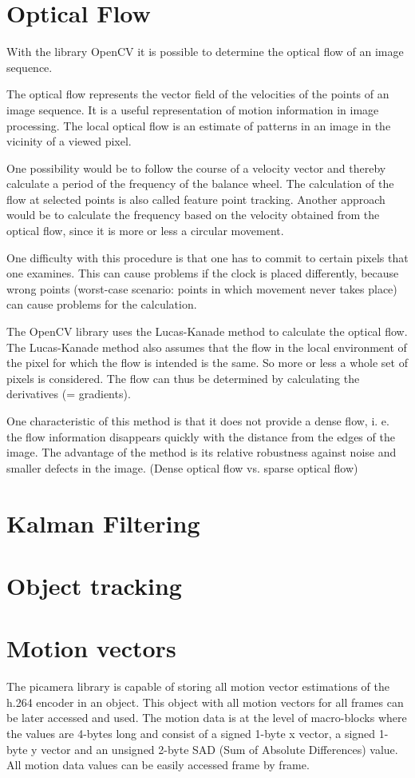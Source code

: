 \documentclass[12pt, a4paper]{report}
\begin{document}
    \section{Optical Flow}
    With the library OpenCV it is possible to determine the optical flow of an image sequence. 
    
    The optical flow represents the vector field of the velocities of the points of an image sequence. It is a useful representation of motion information in image processing. The local optical flow is an estimate of patterns in an image in the vicinity of a viewed pixel. 
    
    One possibility would be to follow the course of a velocity vector and thereby calculate a period of the frequency of the balance wheel. The calculation of the flow at selected points is also called feature point tracking. Another approach would be to calculate the frequency based on the velocity obtained from the optical flow, since it is more or less a circular movement. 
    
    One difficulty with this procedure is that one has to commit to certain pixels that one examines. This can cause problems if the clock is placed differently, because wrong points (worst-case scenario: points in which movement never takes place) can cause problems for the calculation.  
    
    The OpenCV library uses the Lucas-Kanade method to calculate the optical flow. The Lucas-Kanade method also assumes that the flow in the local environment of the pixel for which the flow is intended is the same. So more or less a whole set of pixels is considered. The flow can thus be determined by calculating the derivatives (= gradients). 
    
    One characteristic of this method is that it does not provide a dense flow, i. e. the flow information disappears quickly with the distance from the edges of the image. The advantage of the method is its relative robustness against noise and smaller defects in the image.
    (Dense optical flow vs. sparse optical flow)
  
   \section{Kalman Filtering} 
      \section{Object tracking} 
    
 \section{Motion vectors}
    The picamera library is capable of storing all motion vector estimations of the h.264 encoder in an object. This object with all motion vectors for all frames can be later accessed and used. The motion data is at the level of macro-blocks where the values are 4-bytes long and consist of a signed 1-byte x vector, a signed 1-byte y vector and an unsigned 2-byte SAD (Sum of Absolute Differences) value. All motion data values can be easily accessed frame by frame. \cite{ReadTheDocsPicamera}
    
\end{document}
